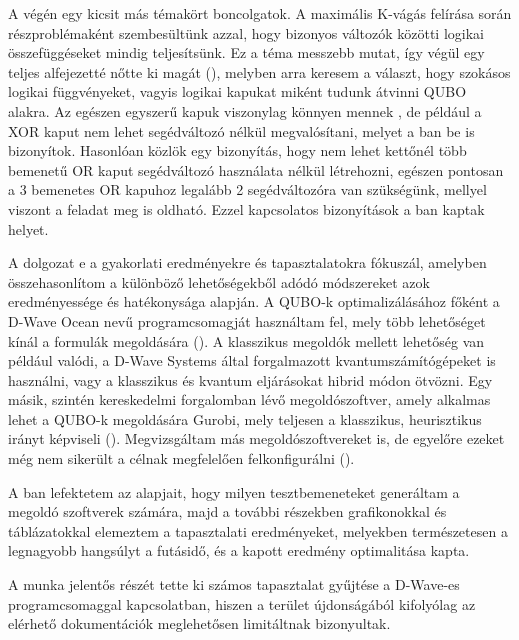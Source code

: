 A  végén egy kicsit más témakört boncolgatok. A maximális K-vágás felírása során részproblémaként szembesültünk azzal, hogy bizonyos változók közötti logikai összefüggéseket mindig teljesítsünk. Ez a téma messzebb mutat, így végül egy teljes alfejezetté nőtte ki magát (), melyben arra keresem a választ, hogy szokásos logikai függvényeket, vagyis logikai kapukat miként tudunk átvinni QUBO alakra. Az egészen egyszerű kapuk viszonylag könnyen mennek , de például a XOR kaput nem lehet segédváltozó nélkül megvalósítani, melyet a ban be is bizonyítok. Hasonlóan közlök egy bizonyítás, hogy nem lehet kettőnél több bemenetű OR kaput segédváltozó használata nélkül létrehozni, egészen pontosan a 3 bemenetes OR kapuhoz legalább 2 segédváltozóra van szükségünk, mellyel viszont a feladat meg is oldható. Ezzel kapcsolatos bizonyítások a ban kaptak helyet.

A dolgozat e a gyakorlati eredményekre és tapasztalatokra fókuszál, amelyben összehasonlítom a különböző lehetőségekből adódó módszereket azok eredményessége és hatékonysága alapján.
A QUBO-k optimalizálásához főként a D-Wave Ocean nevű programcsomagját használtam fel, mely több lehetőséget kínál a formulák megoldására (). A klasszikus megoldók mellett lehetőség van például valódi, a D-Wave Systems által forgalmazott kvantumszámítógépeket is használni, vagy a klasszikus és kvantum eljárásokat hibrid módon ötvözni.
Egy másik, szintén kereskedelmi forgalomban lévő megoldószoftver, amely alkalmas lehet a QUBO-k megoldására Gurobi, mely teljesen a klasszikus, heurisztikus irányt képviseli (). Megvizsgáltam más megoldószoftvereket is, de egyelőre ezeket még nem sikerült a célnak megfelelően felkonfigurálni ().

A ban lefektetem az alapjait, hogy milyen tesztbemeneteket generáltam a megoldó szoftverek számára, majd a további részekben grafikonokkal és táblázatokkal elemeztem a tapasztalati eredményeket, melyekben természetesen a legnagyobb hangsúlyt a futásidő, és a kapott eredmény optimalitása kapta.

A munka jelentős részét tette ki számos tapasztalat gyűjtése a D-Wave-es programcsomaggal kapcsolatban, hiszen a terület újdonságából kifolyólag az elérhető dokumentációk meglehetősen limitáltnak bizonyultak.